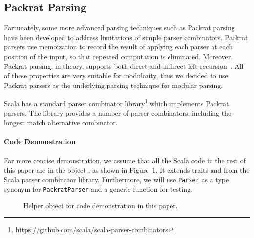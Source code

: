 \subsection{Packrat Parsing}\label{subsec:packratparsing}
Fortunately, some more advanced parsing techniques such as Packrat
parsing~\cite{Ford2002} have been developed to address limitations of
simple parser combinators. Packrat parsers use memoization to record
the result of applying each parser at each position of the input, so
that repeated computation is eliminated. Moreover, Packrat parsing, in
theory, supports both direct and indirect left-recursion~\cite{warth2008}. All of these properties are very suitable for modularity, thus we decided to use Packrat parsers as the underlying parsing technique for modular parsing.
\begin{comment}
It is worth mentioning that the choice of parser combinators will not
affect the other parts of our library. One can choose other parser
combinators like Parsec, in cases that the performance and supporting
of left-recursion are not major concerns. A different library can even build a new
\name with fancy features or higher efficiency.
\end{comment}
Scala has a standard parser combinator library\footnote{https://github.com/scala/scala-parser-combinators}
\cite{moors2008parser} which implements Packrat parsers.
The library provides a number of parser combinators, including the longest match alternative combinator.

\paragraph{Code Demonstration}
For more concise demonstration, we assume that all the Scala code in the rest of this paper are in the object , as shown in Figure~\ref{fig:papercode}. It extends traits  and  from the Scala parser combinator library. Furthermore, we will use \lstinline{Parser} as a type synonym for \lstinline{PackratParser} and a generic  function for testing.

\begin{figure}[t]
\centering
\caption{Helper object for code demonstration in this paper.}\label{fig:papercode}
\end{figure}

